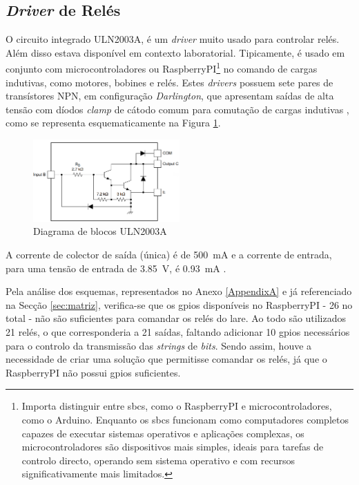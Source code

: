 \subsection{\textit{Driver} de Relés}
\label{sec:driver}
O circuito integrado ULN2003A, é um \textit{driver} muito usado para controlar relés. Além disso estava disponível em contexto laboratorial. Tipicamente, é usado em conjunto com microcontroladores ou \gls{RaspberryPI}\footnote{Importa distinguir entre \gls{sbc}s, como o \gls{RaspberryPI} e microcontroladores, como o Arduino. Enquanto os \gls{sbc}s funcionam como computadores completos capazes de executar sistemas operativos e aplicações complexas, os microcontroladores são dispositivos mais simples, ideais para tarefas de controlo directo, operando sem sistema operativo e com recursos significativamente mais limitados.} no comando de cargas indutivas, como motores, bobines e relés. Estes \textit{drivers} possuem sete pares de transístores NPN, em configuração \textit{Darlington}, que apresentam saídas de alta tensão com díodos \textit{clamp} de cátodo comum para comutação de cargas indutivas \cite{ULN2003}, como se  representa esquematicamente na Figura \ref{fig:2003blocos}.

\begin{figure}[hbtp]
    \centering
    \includegraphics[width=0.5\textwidth]{figures/2003A_Darling.png}
    \caption{Diagrama de blocos ULN2003A \cite{ULN2003}}
    \label{fig:2003blocos}
\end{figure}

A corrente de colector de saída (única) é de \SI{500}{\mA} e a corrente de entrada, para uma tensão de entrada de \SI{3.85}{\volt}, é \SI{0.93}{\mA} \cite{ULN2003}.

Pela análise dos esquemas, representados no Anexo \ref{AppendixA} e já referenciado na Secção \ref{sec:matriz}, verifica-se que os \acrshort{gpio}s disponíveis no \gls{RaspberryPI} - 26 no total - não são suficientes para comandar os relés do \acrshort{lare}. Ao todo são utilizados 21 relés, o que corresponderia a 21 saídas, faltando adicionar 10 \acrshort{gpio}s necessários para o controlo da transmissão das \textit{strings} de \textit{bits}. Sendo assim, houve a necessidade de criar uma solução que permitisse comandar os relés, já que o \gls{RaspberryPI} não possui \acrshort{gpio}s suficientes.

